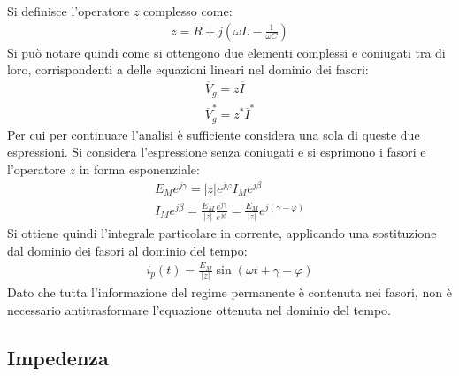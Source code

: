 \documentclass{article}
\numberwithin{equation}{subsection}
\begin{document}
Si definisce l'operatore $z$ complesso come:
\begin{gather*}
    z=R+j\left(\omega L-\displaystyle\frac{1}{\omega C}\right)
\end{gather*}
Si può notare quindi come si ottengono due elementi complessi e coniugati tra di loro, corrispondenti a delle equazioni lineari nel dominio dei fasori:
\begin{gather*}
    \overline{V}_g=z\overline{I}\\
    \overline{V}_g^*=z^*\overline{I}^*
\end{gather*}
Per cui per continuare l'analisi è sufficiente considera una sola di queste due espressioni. Si considera l'espressione senza coniugati e si esprimono i fasori e l'operatore 
$z$ in forma esponenziale:
\begin{gather*}
    E_Me^{j\gamma}=|z|e^{j\varphi}I_Me^{j\beta}\\
    I_Me^{j\beta}=\displaystyle\frac{E_M}{|z|}\frac{e^{j\gamma}}{e^{j\phi}}=\frac{E_M}{|z|}e^{j(\gamma-\varphi)}
\end{gather*} 
Si ottiene quindi l'integrale particolare in corrente, applicando una sostituzione dal dominio dei fasori al dominio del tempo:
\begin{gather*}
    i_p(t)=\displaystyle\frac{E_M}{|z|}\sin(\omega t+\gamma-\varphi)
\end{gather*}
Dato che tutta l'informazione del regime permanente è contenuta nei fasori, non è necessario antitrasformare l'equazione ottenuta nel dominio del tempo. 

\subsection{Impedenza}
\end{document}
